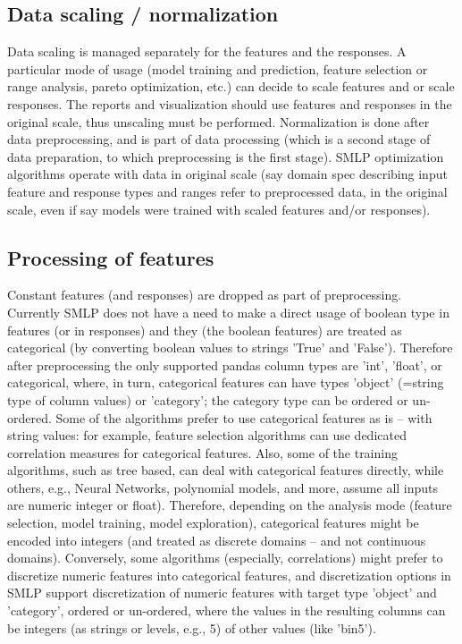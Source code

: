 \documentclass[a4paper,parskip=half]{article} %
\begin{document}
\subsection{Data scaling / normalization}

Data scaling is managed separately for the features and the responses. A particular mode of usage
(model training and prediction, feature selection or range analysis, pareto optimization, etc.)
can decide to scale features and or scale responses. The reports and visualization should use
features and responses in the original scale, thus unscaling must be performed. Normalization is 
done after data preprocessing, and is part of data processing (which is a second stage of data 
preparation, to which preprocessing is the first stage). SMLP optimization algorithms operate
with data in original scale (say domain spec describing input feature and response types and
ranges refer to preprocessed data, in the original scale, even if say models were trained with
scaled features and/or responses).

\subsection{Processing of features}

Constant features (and responses) are dropped as part of preprocessing. Currently SMLP does
not have a need to make a direct usage of boolean type in features (or in responses) 
and they (the boolean features) are treated as categorical (by converting boolean values to
strings 'True' and 'False'). Therefore after preprocessing the only supported pandas column types
are 'int', 'float', or categorical, where, in turn, categorical features can have types 'object' 
(=string type of column values) or 'category'; the category type can be ordered or un-ordered.
Some of the algorithms prefer to use categorical features as is -- with string values: for example,
feature selection algorithms can use dedicated correlation measures for categorical features. Also,
some of the training algorithms, such as tree based, can deal with categorical features directly, 
while others, e.g., Neural Networks, polynomial models, and more, assume all inputs are numeric
integer or float). Therefore, depending on the analysis mode (feature selection, model training,
model exploration), categorical features might be encoded into integers (and treated as discrete 
domains -- and not continuous domains). Conversely, some algorithms (especially, correlations)
might prefer to discretize numeric features into categorical features, and discretization options
in SMLP support discretization of numeric features with target type 'object' and 'category', 
ordered or un-ordered, where the values in the resulting columns can be integers (as strings or
levels, e.g., 5) of other values (like 'bin5').
\end{document}
